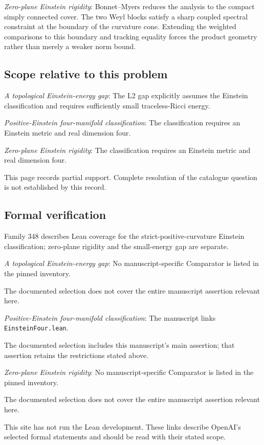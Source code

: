 \documentclass[11pt]{article}
\begin{document}
\textit{Zero-plane Einstein rigidity}: Bonnet--Myers reduces the analysis to the compact simply connected cover. The two Weyl blocks satisfy a sharp coupled spectral constraint at the boundary of the curvature cone. Extending the weighted comparisons to this boundary and tracking equality forces the product geometry rather than merely a weaker norm bound.

\subsection{Scope relative to this problem}
\textit{A topological Einstein-energy gap}: The L2 gap explicitly assumes the Einstein classification and requires sufficiently small traceless-Ricci energy.

\textit{Positive-Einstein four-manifold classification}: The classification requires an Einstein metric and real dimension four.

\textit{Zero-plane Einstein rigidity}: The classification requires an Einstein metric and real dimension four.

This page records partial support. Complete resolution of the catalogue question is not established by this record.

\subsection{Formal verification}
Family 348 describes Lean coverage for the strict-positive-curvature Einstein classification; zero-plane rigidity and the small-energy gap are separate.

\textit{A topological Einstein-energy gap}: No manuscript-specific Comparator is listed in the pinned inventory.

The documented selection does not cover the entire manuscript assertion relevant here.

\textit{Positive-Einstein four-manifold classification}: The manuscript links \texttt{EinsteinFour.lean}.

The documented selection includes this manuscript’s main assertion; that assertion retains the restrictions stated above.

\textit{Zero-plane Einstein rigidity}: No manuscript-specific Comparator is listed in the pinned inventory.

The documented selection does not cover the entire manuscript assertion relevant here.

This site has not run the Lean development. These links describe OpenAI’s selected formal statements and should be read with their stated scope.
\end{document}
